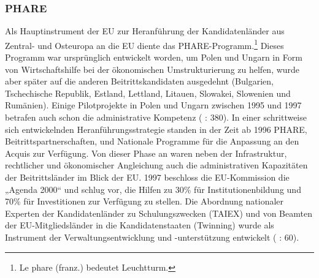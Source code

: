 \subsubsection{PHARE}
Als Hauptinstrument der EU zur Heranführung der Kandidatenländer aus Zentral- und Osteuropa an die EU diente das PHARE-Programm.\footnote{Le phare (franz.) bedeutet Leuchtturm.} Dieses Programm war ursprünglich entwickelt worden, um Polen und Ungarn in Form von Wirtschaftshilfe bei der ökonomischen Umstrukturierung zu helfen, wurde aber später auf die anderen Beitrittskandidaten ausgedehnt (Bulgarien, Tschechische Republik, Estland, Lettland, Litauen, Slowakei, Slowenien und Rumänien). Einige Pilotprojekte in Polen und Ungarn zwischen 1995 und 1997 betrafen auch schon die administrative Kompetenz (\cite{tomtul} : 380). In einer schrittweise sich entwickelnden Heranführungsstrategie standen in der Zeit ab 1996 PHARE, Beitrittspartnerschaften, und Nationale Programme für die Anpassung an den Acquis zur Verfügung. Von dieser Phase an waren neben der Infrastruktur, rechtlicher und ökonomischer Angleichung auch die administrativen Kapazitäten der Beitrittsländer im Blick der EU. 1997 beschloss die EU-Kommission die „Agenda 2000“ und schlug vor, die Hilfen zu 30\% für Institutionenbildung und 70\% für Investitionen zur Verfügung zu stellen. Die Abordnung nationaler Experten der Kandidatenländer zu Schulungszwecken (TAIEX) und von Beamten der EU-Mitgliedsländer in die Kandidatenstaaten (Twinning) wurde als Instrument der Verwaltungsentwicklung und -unterstützung entwickelt (\cite{lipumb04} : 60).\par

